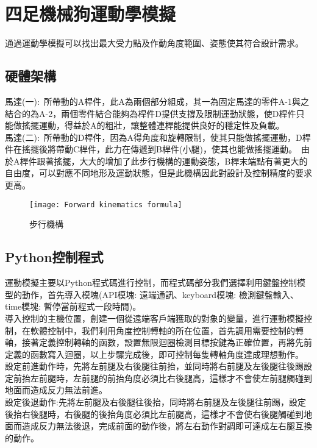 \chapter{四足機械狗運動學模擬}
通過運動學模擬可以找出最大受力點及作動角度範圍、姿態使其符合設計需求。\

\section{硬體架構}
馬達(一):\
所帶動的A桿件，此A為兩個部分組成，其一為固定馬達的零件A-1與之結合的為A-2，兩個零件結合能夠為桿件D提供支撐及限制運動狀態，使D桿件只能做搖擺運動，得益於A的粗壯，讓整體連桿能提供良好的穩定性及負載。\\
馬達(二):\
所帶動的D桿件，因為A得角度和旋轉限制，使其只能做搖擺運動，D桿件在搖擺後將帶動C桿件，此力在傳遞到B桿件(小腿)，使其也能做搖擺運動。\
由於A桿件跟著搖擺，大大的增加了此步行機構的運動姿態，B桿末端點有著更大的自由度，可以對應不同地形及運動狀態，但是此機構因此對設計及控制精度的要求更高。\
\begin{figure}[hbt!]
\center
\texttt{[image: Forward kinematics formula]}
\caption{\Large 步行機構}\label{Forward kinematics formula}
\end{figure}


\section{Python控制程式}
運動模擬主要以Python程式碼進行控制，而程式碼部分我們選擇利用鍵盤控制模型的動作，首先導入模塊(API模塊: 遠端通訊、keyboard模塊: 檢測鍵盤輸入、time模塊: 暫停當前程式一段時間)。\\
導入控制的主機位置，創建一個從遠端客戶端獲取的對象的變量，進行運動模擬控制，在軟體控制中，我們利用角度控制轉軸的所在位置，首先調用需要控制的轉軸，接著定義控制轉軸的函數，設置無限迴圈檢測目標按鍵為正確位置，再將先前定義的函數寫入迴圈，以上步驟完成後，即可控制每隻轉軸角度達成理想動作。\\
設定前進動作時，先將左前腿及右後腿往前抬，並同時將右前腿及左後腿往後踢設定前抬左前腿時，左前腿的前抬角度必須比右後腿高，這樣才不會使左前腿觸碰到地面而造成反力無法前進。\\
設定後退動作:先將左前腿及右後腿往後抬，同時將右前腿及左後腿往前踢，設定後抬右後腿時，右後腿的後抬角度必須比左前腿高，這樣才不會使右後腿觸碰到地面而造成反力無法後退，完成前面的動作後，將左右動作對調即可達成左右腿互換的動作。\\

